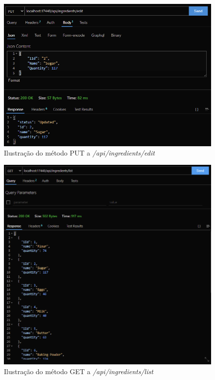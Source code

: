 \begin{figure}[!hbt]
    \centering
    \includegraphics[width=14cm]{Resources/API/Ingredients/Ingredients (6).png}
    \caption{Ilustração do método PUT a \textit{/api/ingredients/edit}}
    
\end{figure}
\FloatBarrier
\begin{figure}[!hbt]
    \centering
    \includegraphics[width=14cm]{Resources/API/Ingredients/Ingredients (7).png}
    \caption{Ilustração do método GET a \textit{/api/ingredients/list}}
    
\end{figure}
